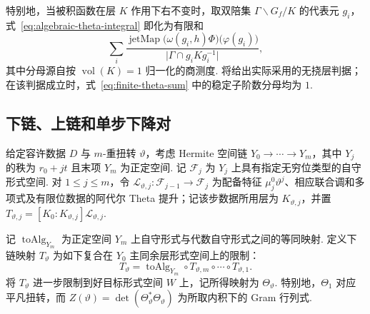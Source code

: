特别地，当被积函数在层 $K$ 作用下右不变时，取双陪集 $\Gamma\backslash G_f/K$ 的代表元 $g_i$，式~\eqref{eq:algebraic-theta-integral} 即化为有限和
\begin{equation}
 \sum_i
 \frac{\operatorname{jetMap}\bigl(\omega(g_i,h)\Phi\bigr)\bigl(\varphi(g_i)\bigr)}
 {\lvert\Gamma\cap g_i K g_i^{-1}\rvert},
 \label{eq:finite-theta-sum}
\end{equation}
其中分母源自按 $\operatorname{vol}(K)=1$ 归一化的商测度. 将给出实际采用的无挠层判据；在该判据成立时，式~\eqref{eq:finite-theta-sum} 中的稳定子阶数分母均为 $1$.

\subsection{下链、上链和单步下降对}

\begin{definition}
\label{def:target-theta-lift}
\emitthmsource
给定容许数据 $D$ 与 $m$-重扭转 $\vartheta$，考虑 Hermite 空间链 $Y_0\to\cdots\to Y_m$，其中 $Y_j$ 的秩为 $r_0+jt$ 且末项 $Y_m$ 为正定空间. 记 $\mathcal F_j$ 为 $Y_j$ 上具有指定无穷位类型的自守形式空间. 对 $1\le j\le m$，令 $\mathcal L_{\vartheta,j}\colon\mathcal F_{j-1}\to\mathcal F_j$ 为配备特征 $\mu_j^0\vartheta^j$、相应联合调和多项式及有限位数据的阿代尔 Theta 提升；记该步数据所用层为 $K_{\vartheta,j}$，并置 $T_{\vartheta,j}=[K_0:K_{\vartheta,j}]\mathcal L_{\vartheta,j}$.

记 $\operatorname{toAlg}_{Y_m}$ 为正定空间 $Y_m$ 上自守形式与代数自守形式之间的等同映射. 定义下链映射 $T_\vartheta$ 为如下复合在 $Y_0$ 主同余层形式空间上的限制：
\begin{equation}
 T_\vartheta=\operatorname{toAlg}_{Y_m}\circ T_{\vartheta,m}\circ\cdots\circ T_{\vartheta,1}.
 \label{eq:lower-theta-chain}
\end{equation}
将 $T_\vartheta$ 进一步限制到好目标形式空间 $W$ 上，记所得映射为 $\Theta_\vartheta$. 特别地，$\Theta_1$ 对应平凡扭转，而 $Z(\vartheta)=\det(\Theta_\vartheta^*\Theta_\vartheta)$ 为所取内积下的 Gram 行列式.
\end{definition}

